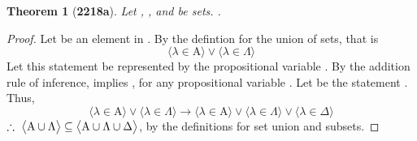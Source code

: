 \documentclass[preview]{standalone}
\newtheorem*{theorem*}{Theorem}
\begin{document}
\begin{theorem*}[\textbf{2218a}] \color{black}
    Let , \bm{$\Lambda$}, and \bm{$\Delta$} be sets. 
    .
\end{theorem*}
\begin{proof} \color{black}
    Let \bm{$\lambda$} be an element in . 
    By the defintion for the union of sets, that is
    \begin{equation*}
        \Big \langle \lambda \in \mathrm{A} \Big \rangle
            \lor 
        \Big \langle \lambda \in \Lambda \Big \rangle
    \end{equation*}
    Let this statement be represented by the propositional variable . 
    By the addition rule of inference,  implies , 
    for any propositional variable . 
    Let  be the statement \bm{$\lambda \in \Delta$}. 
    Thus,
    \begin{equation*}
        \Big \langle \lambda \in \mathrm{A} \Big \rangle
            \lor 
        \Big \langle \lambda \in \Lambda \Big \rangle
            \rightarrow
        \Big \langle \lambda \in \mathrm{A} \Big \rangle
            \lor 
        \Big \langle \lambda \in \Lambda \Big \rangle
            \lor
        \Big \langle \lambda \in \Delta \Big \rangle
    \end{equation*}
    $\therefore \text{\space} \relax{
    \big \langle \mathrm{A} \cup \Lambda \big \rangle
        \subseteq 
    \big \langle \mathrm{A} \cup \Lambda \cup \Delta \big \rangle
    }
    $,
    by the definitions for set union and subsets.
\color{lightgray} \end{proof}
\end{document}
